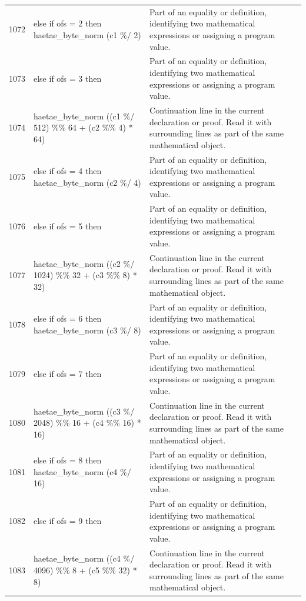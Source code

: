 \documentclass[10pt]{article}
\begin{document}
\begin{longtable}{r L{0.53\textwidth} L{0.37\textwidth}}
1072 & {\ttfamily\scriptsize   else if ofs = 2 then haetae\_byte\_norm (c1 \%/ 2)} & Part of an equality or definition, identifying two mathematical expressions or assigning a program value. \\
1073 & {\ttfamily\scriptsize   else if ofs = 3 then} & Part of an equality or definition, identifying two mathematical expressions or assigning a program value. \\
1074 & {\ttfamily\scriptsize     haetae\_byte\_norm ((c1 \%/ 512) \%\% 64 + (c2 \%\% 4) * 64)} & Continuation line in the current declaration or proof.  Read it with surrounding lines as part of the same mathematical object. \\
1075 & {\ttfamily\scriptsize   else if ofs = 4 then haetae\_byte\_norm (c2 \%/ 4)} & Part of an equality or definition, identifying two mathematical expressions or assigning a program value. \\
1076 & {\ttfamily\scriptsize   else if ofs = 5 then} & Part of an equality or definition, identifying two mathematical expressions or assigning a program value. \\
1077 & {\ttfamily\scriptsize     haetae\_byte\_norm ((c2 \%/ 1024) \%\% 32 + (c3 \%\% 8) * 32)} & Continuation line in the current declaration or proof.  Read it with surrounding lines as part of the same mathematical object. \\
1078 & {\ttfamily\scriptsize   else if ofs = 6 then haetae\_byte\_norm (c3 \%/ 8)} & Part of an equality or definition, identifying two mathematical expressions or assigning a program value. \\
1079 & {\ttfamily\scriptsize   else if ofs = 7 then} & Part of an equality or definition, identifying two mathematical expressions or assigning a program value. \\
1080 & {\ttfamily\scriptsize     haetae\_byte\_norm ((c3 \%/ 2048) \%\% 16 + (c4 \%\% 16) * 16)} & Continuation line in the current declaration or proof.  Read it with surrounding lines as part of the same mathematical object. \\
1081 & {\ttfamily\scriptsize   else if ofs = 8 then haetae\_byte\_norm (c4 \%/ 16)} & Part of an equality or definition, identifying two mathematical expressions or assigning a program value. \\
1082 & {\ttfamily\scriptsize   else if ofs = 9 then} & Part of an equality or definition, identifying two mathematical expressions or assigning a program value. \\
1083 & {\ttfamily\scriptsize     haetae\_byte\_norm ((c4 \%/ 4096) \%\% 8 + (c5 \%\% 32) * 8)} & Continuation line in the current declaration or proof.  Read it with surrounding lines as part of the same mathematical object. \\

\end{longtable}
\end{document}
